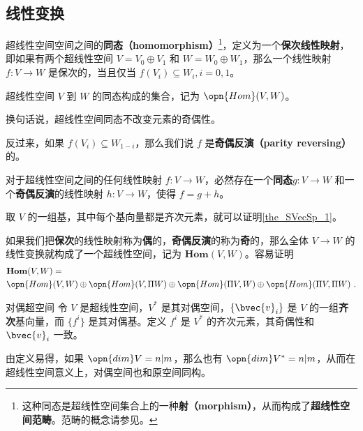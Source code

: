 \subsection{线性变换}

超线性空间空间之间的\textbf{同态（homomorphism）}\footnote{这种同态是超线性空间集合上的一种\textbf{射（morphism）}，从而构成了\textbf{超线性空间范畴}。范畴的概念请参见。}，定义为一个\textbf{保次线性映射}，即如果有两个超线性空间 $V=V_0\oplus V_1$ 和 $W=W_0\oplus W_1$，那么一个线性映射 $f:V\to W$ 是保次的，当且仅当 $f(V_i)\subseteq W_i, i=0, 1$。

\begin{definition}{}
超线性空间 $V$ 到 $W$ 的同态构成的集合，记为 $\opn{Hom}(V, W)$。
\end{definition}

换句话说，超线性空间同态不改变元素的奇偶性。

反过来，如果 $f(V_i)\subseteq W_{1-i}$，那么我们说 $f$ 是\textbf{奇偶反演（parity reversing）}的。

\begin{theorem}{}\label{the_SVecSp_1}
对于超线性空间之间的任何线性映射 $f:V\to W$，必然存在一个\textbf{同态}$g:V\to W$ 和一个\textbf{奇偶反演}的线性映射 $h:V\to W$，使得 $f=g+h$。
\end{theorem}

取 $V$ 的一组基，其中每个基向量都是齐次元素，就可以证明\autoref{the_SVecSp_1}。

如果我们把\textbf{保次}的线性映射称为\textbf{偶}的，\textbf{奇偶反演}的称为\textbf{奇}的，那么全体 $V\to W$ 的线性变换就构成了一个超线性空间，记为 $\mathbf{Hom}(V, W)$。容易证明
\begin{equation}
\begin{aligned}
&\mathbf{Hom}(V, W)=\\&\opn{Hom}(V, W)\oplus\opn{Hom}(V, \Pi W)\oplus\opn{Hom}(\Pi V, W)\oplus\opn{Hom}(\Pi V, \Pi W)~.
\end{aligned}
\end{equation}

\begin{definition}{对偶超空间}
令 $V$ 是超线性空间，$V^*$ 是其对偶空间，$\{\bvec{v}_i\}$ 是 $V$ 的一组\textbf{齐次}基向量，而 $\{f^i\}$ 是其对偶基。定义 $f^i$ 是 $V^*$ 的齐次元素，其奇偶性和 $\bvec{v}_i$ 一致。
\end{definition}

由定义易得，如果 $\opn{dim}V=n|m$，那么也有 $\opn{dim}V^*=n|m$，从而在超线性空间意义上，对偶空间也和原空间同构。


